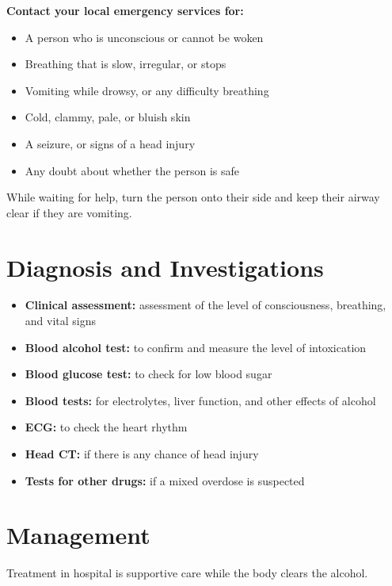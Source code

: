 \textbf{Contact your local emergency services for:}
\begin{itemize}
    \item A person who is unconscious or cannot be woken
    \item Breathing that is slow, irregular, or stops
    \item Vomiting while drowsy, or any difficulty breathing
    \item Cold, clammy, pale, or bluish skin
    \item A seizure, or signs of a head injury
    \item Any doubt about whether the person is safe
\end{itemize}

While waiting for help, turn the person onto their side and keep their airway clear if they are vomiting.

\section*{Diagnosis and Investigations}
\begin{itemize}
    \item \textbf{Clinical assessment:} assessment of the level of consciousness, breathing, and vital signs
    \item \textbf{Blood alcohol test:} to confirm and measure the level of intoxication
    \item \textbf{Blood glucose test:} to check for low blood sugar
    \item \textbf{Blood tests:} for electrolytes, liver function, and other effects of alcohol
    \item \textbf{ECG:} to check the heart rhythm
    \item \textbf{Head CT:} if there is any chance of head injury
    \item \textbf{Tests for other drugs:} if a mixed overdose is suspected
\end{itemize}

\section*{Management}
Treatment in hospital is supportive care while the body clears the alcohol.

